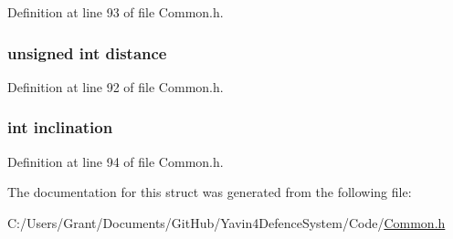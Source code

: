 Definition at line 93 of file Common.\+h.

\hypertarget{struct_tracking_data_a4bb47863775a37236bda65273c01b275}{
\subsubsection[{distance}]{\setlength{\rightskip}{0pt plus 5cm}unsigned int distance}}\label{struct_tracking_data_a4bb47863775a37236bda65273c01b275}


Definition at line 92 of file Common.\+h.

\hypertarget{struct_tracking_data_af308b9934394c8bcf7614eb1df2d863f}{
\subsubsection[{inclination}]{\setlength{\rightskip}{0pt plus 5cm}int inclination}}\label{struct_tracking_data_af308b9934394c8bcf7614eb1df2d863f}


Definition at line 94 of file Common.\+h.



The documentation for this struct was generated from the following file\+:\begin{DoxyCompactItemize}
\item 
C\+:/\+Users/\+Grant/\+Documents/\+Git\+Hub/\+Yavin4\+Defence\+System/\+Code/\hyperlink{_common_8h}{Common.\+h}\end{DoxyCompactItemize}
